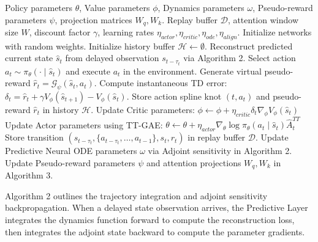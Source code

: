 \documentclass[manuscript, screen, review]{jair}
\begin{document}
\begin{algorithm}[h]
\caption{Tri-Temporal Actor-Critic (TTAC) Training Loop}
\label{alg:ttac_main}
\begin{algorithmic}[1]
\REQUIRE Policy parameters $\theta$, Value parameters $\phi$, Dynamics parameters $\omega$, Pseudo-reward parameters $\psi$, projection matrices $W_q, W_k$.
\REQUIRE Replay buffer $\mathcal{D}$, attention window size $W$, discount factor $\gamma$, learning rates $\eta_{actor}, \eta_{critic}, \eta_{ode}, \eta_{align}$.
\STATE Initialize networks with random weights.
\STATE Initialize history buffer $\mathcal{H} \leftarrow \emptyset$.
    \STATE Reconstruct predicted current state $\hat{s}_t$ from delayed observation $s_{t-\tau_t}$ via Algorithm 2.
    \STATE Select action $a_t \sim \pi_\theta(\cdot \mid \hat{s}_t)$ and execute $a_t$ in the environment.
    \STATE Generate virtual pseudo-reward $\hat{r}_t = \mathcal{G}_\psi(\hat{s}_t, a_t)$.
    \STATE Compute instantaneous TD error: $\delta_t = \hat{r}_t + \gamma V_\phi(\hat{s}_{t+1}) - V_\phi(\hat{s}_t)$.
    \STATE Store action spline knot $(t, a_t)$ and pseudo-reward $\hat{r}_t$ in history $\mathcal{H}$.
    \STATE Update Critic parameters:
    \STATE \quad $\phi \leftarrow \phi + \eta_{critic} \delta_t \nabla_\phi V_\phi(\hat{s}_t)$
    \STATE Update Actor parameters using TT-GAE:
    \STATE \quad $\theta \leftarrow \theta + \eta_{actor} \nabla_\theta \log \pi_\theta(a_t \mid \hat{s}_t) \hat{A}_t^{TT}$
        \STATE Store transition $(s_{t-\tau_t}, \{a_{t-\tau_t}, \dots, a_{t-1}\}, s_t, r_t)$ in replay buffer $\mathcal{D}$.
        \STATE Update Predictive Neural ODE parameters $\omega$ via Adjoint sensitivity in Algorithm 2.
        \STATE Update Pseudo-reward parameters $\psi$ and attention projections $W_q, W_k$ in Algorithm 3.
    \ENDIF
\ENDFOR
\end{algorithmic}
\end{algorithm}

Algorithm 2 outlines the trajectory integration and adjoint sensitivity backpropagation. When a delayed state observation arrives, the Predictive Layer integrates the dynamics function forward to compute the reconstruction loss, then integrates the adjoint state backward to compute the parameter gradients.
\end{document}
